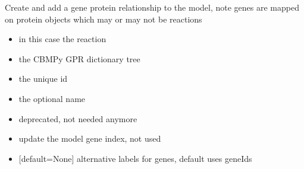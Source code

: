 \documentclass[letterpaper,10pt,english]{sphinxmanual}
\begin{document}
\begin{fulllineitems}
\begin{fulllineitems}
\label{\detokenize{modules_doc:cbmpy.CBModel.Model.createGeneProteinAssociationFromTree}}
\pysigstartsignatures
{}
\pysigstopsignatures
\sphinxAtStartPar
Create and add a gene protein relationship to the model, note genes are mapped on protein objects which may or may not be reactions
\begin{itemize}
\item {} 
\sphinxAtStartPar
{} in this case the reaction

\item {} 
\sphinxAtStartPar
{} the CBMPy GPR dictionary tree

\item {} 
\sphinxAtStartPar
{} the unique id

\item {} 
\sphinxAtStartPar
{} the optional name

\item {} 
\sphinxAtStartPar
{} deprecated, not needed anymore

\item {} 
\sphinxAtStartPar
{} update the model gene index, not used

\item {} 
\sphinxAtStartPar
{} {[}default=None{]} alternative labels for genes, default uses geneIds

\end{itemize}

\end{fulllineitems}



\end{fulllineitems}
\end{document}
